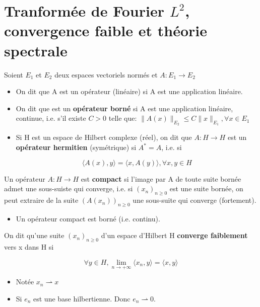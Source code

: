 \documentclass[10pt,a4paper,oneside]{article}
\newenvironment{definition}[1][Definition]{\begin{trivlist}
\item[\hskip \labelsep {\bfseries #1}]}{\end{trivlist}}
\begin{document}
\section{Tranformée de Fourier $L^2$, convergence faible et théorie spectrale}


\begin{definition}

\item
Soient $E_1$ et $E_2$ deux espaces vectoriels normés et $A: E_1 \rightarrow E_2$

\begin{itemize}

\item
On dit que A est un opérateur (linéaire) si A est une application linéaire.

\item

On dit que est un \textbf{opérateur borné} si A est une application linéaire, continue, i.e. s'il existe $C > 0$ telle que: $\|A(x)\|_{E_2} \leq C \|x\|_{E_1}, \forall x \in E_1$

\item
Si H est un espace de Hilbert complexe (réel), on dit que $A: H \rightarrow H$ est un \textbf{opérateur hermitien} (symétrique) si $A^* = A$, i.e. si

\[ \langle A(x),y \rangle = \langle x,A(y) \rangle , \forall x,y \in H \]

\end{itemize}

\end{definition}


\begin{definition}
Un opérateur $A: H \rightarrow H$ est \textbf{compact} si l'image par A de toute suite bornée admet une sous-suiste qui converge, i.e. si $(x_n)_{n\geq0}$ est une suite bornée, on peut extraire de la suite $(A(x_n))_{n\geq0}$ une sous-suite qui converge (fortement).

\begin{itemize}
\item
Un opérateur compact est borné (i.e. continu).
\end{itemize}

\end{definition}

\begin{definition}
On dit qu'une suite $(x_n)_{n\geq0}$ d'un espace d'Hilbert H \textbf{converge faiblement} vers x dans H si

\[ \forall y \in H, \lim\limits_{n\rightarrow+\infty}\langle x_n,y \rangle = \langle x,y \rangle \]

\begin{itemize}

\item
Notée $x_n \rightharpoonup x$

\item
Si $e_n$ est une base hilbertienne. Donc $e_n \rightharpoonup 0$.

\end{itemize}

\end{definition}
\end{document}
